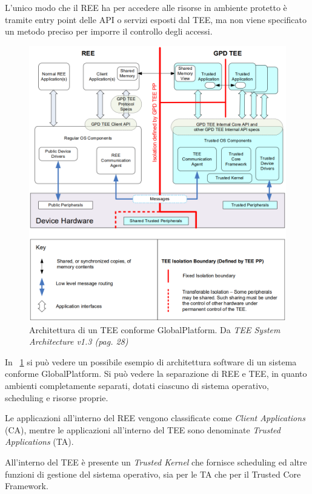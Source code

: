 \documentclass[12pt,italian]{report}
\begin{document}
	L'unico modo che il REE ha per accedere alle risorse in ambiente protetto è tramite entry point delle API o servizi esposti dal TEE, ma non viene specificato un metodo preciso per imporre il controllo degli accessi.
	
	\begin{figure}
		\centering
		\includegraphics[width=1\textwidth]{immagini/TEE_SW_Architecture}
		\caption{
			Architettura di un TEE conforme GlobalPlatform. 
			Da \textit{TEE System Architecture v1.3 (pag. 28)}
			\cite{gp2020systemarchitecture}
		}
		\label{fig:tee-architecture}
	\end{figure}
	
	\bigbreak
	
	In \figurename~\ref{fig:tee-architecture} si può vedere un possibile esempio di architettura software di un sistema conforme GlobalPlatform. Si può vedere la separazione di REE e TEE, in quanto ambienti completamente separati, dotati ciascuno di sistema operativo, scheduling e risorse proprie.
	
	Le applicazioni all'interno del REE vengono classificate come \textit{Client Applications} (CA), mentre le applicazioni all'interno del TEE sono denominate \textit{Trusted Applications} (TA).
	
	All'interno del TEE è presente un \textit{Trusted Kernel} che fornisce scheduling ed altre funzioni di gestione del sistema operativo, sia per le TA che per il Trusted Core Framework.
	
\end{document}
